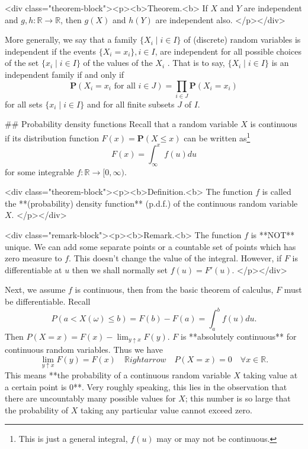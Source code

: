 <div class="theorem-block"><p><b>Theorem.<b> 
If $X$ and $Y$ are independent and $g, h: \mathbb{R} \to \mathbb{R}$, then $g(X)$ and $h(Y)$ are independent also. 
</p></div>

More generally, we say that a family $\{ X_i \;\vert\; i \in I\}$ of (discrete) random variables is independent if the events $\{X_i = x_i \}, i \in I$, are independent for all possible choices of the set $\{x_i \;\vert\; i \in I\}$ of the values of the $X_i$ . That is to say, $\{X_i \;\vert\; i \in I \}$ is an independent family if and only if 
$$\begin{equation}
    \mathbf{P}(X_i = x_i \text{ for all }i\in J) = \prod_{i\in J} \mathbf{P}(X_i = x_i)
\end{equation}$$
for all sets $\{x_i \;\vert\; i \in I\}$ and for all finite subsets $J$ of $I$.


## Probability density functions
Recall that a random variable $X$ is continuous if its distribution function $F(x) = \mathbf{P}(X \leq x)$ can be written as\footnote{This is just a general integral, $f(u)$ may or may not be continuous.}
$$\begin{equation}
    F(x) = \int_{\infty}^x f(u)du
\end{equation}$$
for some integrable $f: \mathbb{R} \to [0, \infty)$.

<div class="theorem-block"><p><b>Definition.<b> 
The function $f$ is called the **(probability) density function** (p.d.f.) of the continuous random variable $X$. 
</p></div>

<div class="remark-block"><p><b>Remark.<b> 
The function $f$ is **NOT** unique. We can add some separate points or a countable set of points which has zero measure to $f$. This doesn't change the value of the integral. However, if $F$ is differentiable at $u$ then we shall normally set $f(u) = F'(u)$. 
</p></div>

Next, we assume $f$ is continuous, then from the basic theorem of calculus, $F$ must be differentiable. Recall 
$$\begin{equation}
    P(a < X(\omega) \leq b) = F(b) - F(a) = \int_{a}^b f(u)du.
\end{equation}$$
Then $P(X=x) = F(x) - \lim_{y \uparrow x} F(y)$. $F$ is **absolutely continuous** for continuous random variables. Thus we have
$$\begin{equation}
    \lim_{y\uparrow x} F(y) = F(x) \quad \mathbb{R}ightarrow \quad P(X=x) = 0 \quad \forall x\in\mathbb{R}.
\end{equation}$$
This means **the probability of a continuous random variable $X$ taking value at a certain point is 0**. Very roughly speaking, this lies in the observation that there are uncountably many possible values for $X$; this number is so large that the probability of $X$ taking any particular value cannot exceed zero. 

